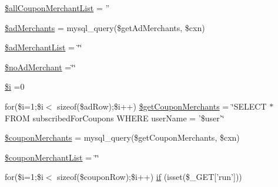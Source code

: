 \begin{DoxyCompactItemize}
\hyperlink{_m_c_maccount_settings_8php_aaa22e8608f806a04f7f5bd340ca807d6}{\$all\-Coupon\-Merchant\-List} = ''
\item 
\hyperlink{_m_c_maccount_settings_8php_a606d9139cc8585dd4ad8bf2f3897dcab}{\$ad\-Merchants} = mysql\-\_\-query(\$get\-Ad\-Merchants, \$cxn)
\item 
\hyperlink{_m_c_maccount_settings_8php_adda5f8d6a5918a17bc6145750958506f}{\$ad\-Merchant\-List} = \char`\"{}\char`\"{}
\item 
\hyperlink{_m_c_maccount_settings_8php_a40bc7f7e5d2e32caabe23be33f8ebfbc}{\$no\-Ad\-Merchant} =\char`\"{}\char`\"{}
\item 
\hyperlink{_m_c_maccount_settings_8php_a83018d9153d17d91fbcf3bc10158d34f}{\$i} =0
\item 
for(\$i=1;\$i$<$ sizeof(\$ad\-Row);\$i++) \hyperlink{_m_c_maccount_settings_8php_ad7ff3bd6b64ab03c84762e87bdb49b94}{\$get\-Coupon\-Merchants} = \char`\"{}S\-E\-L\-E\-C\-T $\ast$ F\-R\-O\-M subscribed\-For\-Coupons W\-H\-E\-R\-E user\-Name = '\$user'\char`\"{}
\item 
\hyperlink{_m_c_maccount_settings_8php_a3a32827acfafa83441c5161bcf7eceef}{\$coupon\-Merchants} = mysql\-\_\-query(\$get\-Coupon\-Merchants, \$cxn)
\item 
\hyperlink{_m_c_maccount_settings_8php_a773d789a200d6fa9d2b0342a5d6af9fd}{\$coupon\-Merchant\-List} = \char`\"{}\char`\"{}
\item 
for(\$i=1;\$i$<$ sizeof(\$coupon\-Row);\$i++) \hyperlink{_m_c_maccount_settings_8php_a648419c218c2f0aeb239028519ab83d8}{if} (isset(\$\-\_\-\-G\-E\-T\mbox{[}'run'\mbox{]}))
\end{DoxyCompactItemize}


